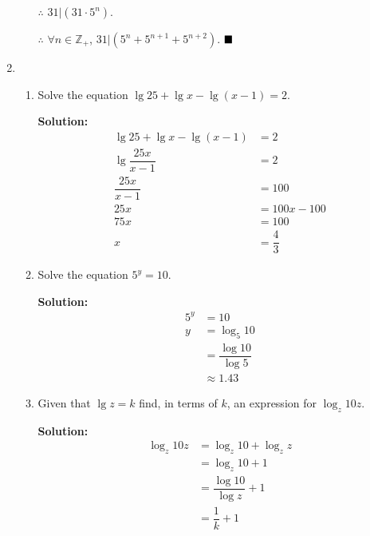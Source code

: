 \documentclass{report}
\newcommand{\sol}{\vspace{0.2cm}\textbf{Solution:}\vspace{0.2cm}}
\begin{document}
\begin{multicols*}{2}
\begin{enumerate}[leftmargin=*]
\begin{enumerate}
                        $\therefore$ $31 | (31 \cdot 5^n)$.

                        $\therefore$ $\forall n \in \mathbb{Z}_+$, $31 | (5^n + 5^{n+1} + 5^{n+2})$. $\hfill\blacksquare$
              \end{enumerate}

        \item \begin{enumerate}
                  \item Solve the equation $\lg 25+\lg x-\lg (x-1)=2$.

                        \sol{}
                        \begin{align*}
                            \lg 25 + \lg x - \lg (x-1) & = 2            \\
                            \lg \dfrac{25x}{x-1}       & = 2            \\
                            \dfrac{25x}{x-1}           & = 100          \\
                            25x                        & = 100x - 100   \\
                            75x                        & = 100          \\
                            x                          & = \dfrac{4}{3}
                        \end{align*}

                  \item Solve the equation $5^{y}=10$.

                        \sol{}
                        \begin{align*}
                            5^y & = 10                      \\
                            y   & = \log_5 10               \\
                                & = \dfrac{\log 10}{\log 5} \\
                                & \approx 1.43
                        \end{align*}
                  \item Given that $\lg z=k$ find, in terms of $k$, an expression for $\log _z 10 z$.

                        \sol{}
                        \begin{align*}
                            \log_z 10z & = \log_z 10 + \log_z z        \\
                                       & = \log_z 10 + 1               \\
                                       & = \dfrac{\log 10}{\log z} + 1 \\
                                       & = \dfrac{1}{k} + 1
                        \end{align*}
              \end{enumerate}


\end{enumerate}
\end{multicols*}
\end{document}
